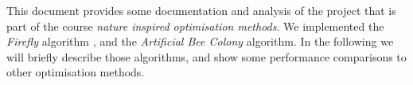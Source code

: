 This document provides some documentation and analysis of the project that is
part of the course \textit{nature inspired optimisation methods}. We
implemented the \textit{Firefly} algorithm \cite{firefly}, and the
\textit{Artificial Bee Colony} \cite{beecolony} algorithm. In the following we
will briefly describe those algorithms, and show some performance comparisons
to other optimisation methods.
